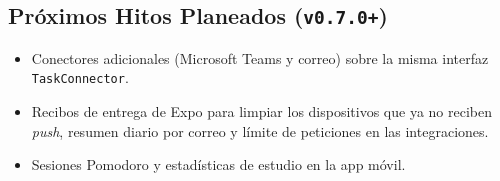 \documentclass[11pt,letterpaper]{article}
\begin{document}
\subsection*{Próximos Hitos Planeados (\texttt{v0.7.0+})}
\begin{itemize}[leftmargin=1.5em, itemsep=2pt]
  \item Conectores adicionales (Microsoft Teams y correo) sobre la misma interfaz \texttt{TaskConnector}.
  \item Recibos de entrega de Expo para limpiar los dispositivos que ya no reciben \emph{push}, resumen diario por correo y límite de peticiones en las integraciones.
  \item Sesiones Pomodoro y estadísticas de estudio en la app móvil.
\end{itemize}
\end{document}
